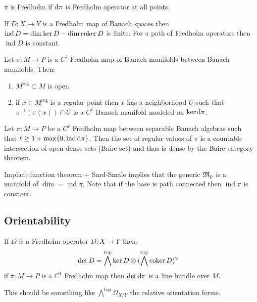 \documentclass[12pt]{article}
\DeclareMathOperator{\ind}{\mathrm{ind}}
\begin{document}
\begin{defn}
$\pi$ is Fredholm if $\mathrm{d}{\pi}$ is Fredholm operator at all points. 
\end{defn}

\newcommand{\reg}{\mathrm{reg}}

\begin{rmk}
If $D : X \to Y$ is a Fredholm map of Banach spaces then $\ind{D} = \dim{\ker{D}} - \dim{\coker{D}}$ is finite. For a path of Fredholm operators then $\ind{D}$ is constant. 
\end{rmk}

\begin{thm}
Let $\pi : M \to P$ is a $C^\ell$ Fredholm map of Banach manifolds between Banach manifolds. Then:
\begin{enumerate}
\item $M^{\reg} \subset M$ is open
\item if $x \in M^{\reg}$ is a regular point then $x$ has a neighborhood $U$ such that $\pi^{-1}(\pi(x)) \cap U$ is a $C^\ell$ Banach manifold modeled on $\ker{\mathrm{d}{\pi}}$. 
\end{enumerate}
\end{thm}

\begin{thm}
Let $\pi : M \to P$ be a $C^\ell$ Fredholm map between separable Banach algebras such that $\ell \ge 1 + \max \{ 0, \ind{\d{\pi}} \}$. Then the set of regular values of $\pi$ is a countable intersection of open dense sets (Baire set) and thus is dense by the Baire category theorem. 
\end{thm}

\begin{cor}
Implicit function theorem + Sard-Smale implies that the generic $\mathfrak{M}_p$ is a manifold of $\dim = \ind{\pi}$. Note that if the base is path connected then $\ind{\pi}$ is constant. 
\end{cor}

\subsection{Orientability}

If $D$ is a Fredholm operator $D : X \to Y$ then,
\[ \det{D} = \bigwedge^{\mathrm{top}} \ker{D} \otimes (\bigwedge^{\mathrm{top}} \operatorname{\mathrm{coker}}{D})^\vee \]
if $\pi : M \to P$ is a $C^1$ Fredholm map then $\det{\mathrm{d}{\pi}}$ is a line bundle over $M$.

\begin{rmk}
This should be something like $\bigwedge^{\mathrm{top}} \Omega_{X/Y}$ the relative orientation forms.
\end{rmk}
\end{document}
